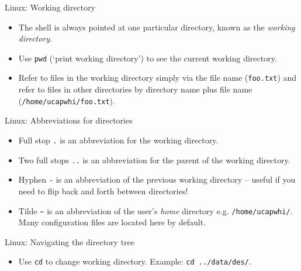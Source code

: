\documentclass{beamer}
\newcommand{\command}[1]{\colorbox{light-gray}{\texttt{#1}}}
\newcommand{\filename}[1]{\colorbox{light-green}{\texttt{#1}}}
\begin{document}
\begin{frame}{Linux: Working directory}
  \begin{itemize}
    \item{The shell is always pointed at one particular directory, known as the \textit{working directory}.}
    \item{Use \command{pwd} (`print working directory') to see the current working directory.}
    \item{Refer to files in the working directory simply via the file name (\filename{foo.txt}) and refer to files in other directories by directory name plus file name (\filename{/home/ucapwhi/foo.txt}).}
  \end{itemize}
\end{frame}


\begin{frame}{Linux: Abbreviations for directories}
  \begin{itemize}
    \item{Full stop \filename{.} is an abbreviation for the working directory.}
    \item{Two full stops \filename{..} is an abbreviation for the parent of the working directory.}
    \item{Hyphen \filename{-} is an abbreviation of the previous working directory -- useful if you need to flip back and forth between directories!}
    \item{Tilde \filename{\textasciitilde} is an abbreviation of the user's \textit{home} directory e.g. \filename{/home/ucapwhi/}. Many configuration files are located here by default.}
  \end{itemize}
\end{frame}


\begin{frame}{Linux: Navigating the directory tree}
  \begin{itemize}
    \item{Use \command{cd} to change working directory. Example: \command{cd ../data/des/}.}
  \end{itemize}
\end{frame}


\end{document}
